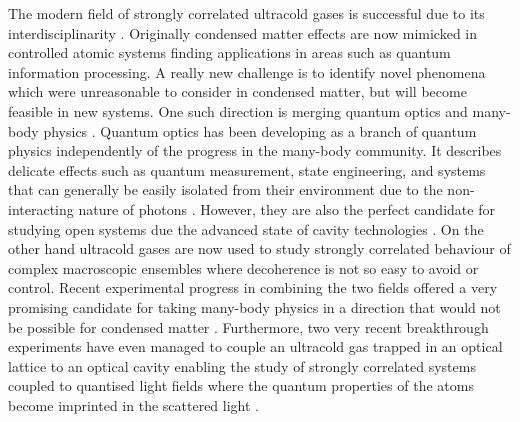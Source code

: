 The modern field of strongly correlated ultracold gases is successful
due to its interdisciplinarity \cite{lewenstein2007,
  bloch2008}. Originally condensed matter effects are now mimicked in
controlled atomic systems finding applications in areas such as
quantum information processing. A really new challenge is to identify
novel phenomena which were unreasonable to consider in condensed
matter, but will become feasible in new systems. One such direction is
merging quantum optics and many-body physics \cite{mekhov2012,
  ritsch2013}. Quantum optics has been developing as a branch of
quantum physics independently of the progress in the many-body
community. It describes delicate effects such as quantum measurement,
state engineering, and systems that can generally be easily isolated
from their environment due to the non-interacting nature of photons
\cite{Scully}. However, they are also the perfect candidate for
studying open systems due the advanced state of cavity technologies
\cite{carmichael, MeasurementControl}. On the other hand ultracold
gases are now used to study strongly correlated behaviour of complex
macroscopic ensembles where decoherence is not so easy to avoid or
control. Recent experimental progress in combining the two fields
offered a very promising candidate for taking many-body physics in a
direction that would not be possible for condensed matter
\cite{baumann2010, wolke2012, schmidt2014}. Furthermore, two very
recent breakthrough experiments have even managed to couple an
ultracold gas trapped in an optical lattice to an optical cavity
enabling the study of strongly correlated systems coupled to quantised
light fields where the quantum properties of the atoms become
imprinted in the scattered light \cite{klinder2015, landig2016}.

